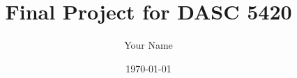 \documentclass{beamer}
\title{Final Project for DASC 5420}
\author{Your Name}
\date{\today}
\begin{document}
\frame{\titlepage}







\end{document}
